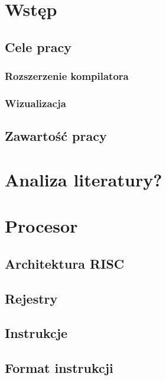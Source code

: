 \documentclass[11pt]{aghdpl}
\author{Kamil Bienek}
\date{2021}
\begin{document}
\titlepages

{
	\fancyhf{}
	\renewcommand{\headrulewidth}{0pt}
	\renewcommand{\footrulewidth}{0pt}
}

\setcounter{tocdepth}{2}
\tableofcontents
\clearpage

%
%
%
%

\chapter{Wstęp}
\section{Cele pracy}
\subsection{Rozszerzenie kompilatora}
\subsection{Wizualizacja}
\section{Zawartość pracy}

\chapter{Analiza literatury?}

\chapter{Procesor}
\section{Architektura RISC}
\section{Rejestry}
\section{Instrukcje}
\section{Format instrukcji}
\end{document}
